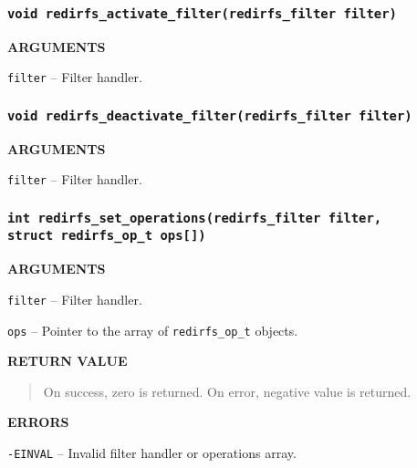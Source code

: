 \subsubsection{\texttt{void redirfs\_activate\_filter(redirfs\_filter filter)}}
\begin{list}{}{}
	\item \textbf{ARGUMENTS}
		\begin{list}{}{}
			\item \texttt{filter} -- Filter handler.
		\end{list}
\end{list}

\subsubsection{\texttt{void redirfs\_deactivate\_filter(redirfs\_filter filter)}}
\begin{list}{}{}
	\item \textbf{ARGUMENTS}
		\begin{list}{}{}
			\item \texttt{filter} -- Filter handler.
		\end{list}
\end{list}

\subsubsection{\texttt{int redirfs\_set\_operations(redirfs\_filter filter,\\struct
redirfs\_op\_t ops[])}}
\begin{list}{}{}
	\item \textbf{ARGUMENTS}
		\begin{list}{}{}
			\item \texttt{filter} -- Filter handler.
			\item \texttt{ops} -- Pointer to the array of
				\texttt{redirfs\_op\_t} objects.
		\end{list}
	\item \textbf{RETURN VALUE}
		\begin{quotation}
			\noindent On success, zero is returned. On error, negative
			value is returned.
		\end{quotation}
	\item \textbf{ERRORS}
		\begin{list}{}{}
			\item \texttt{-EINVAL} -- Invalid filter handler or operations
				array.
		\end{list}
\end{list}


